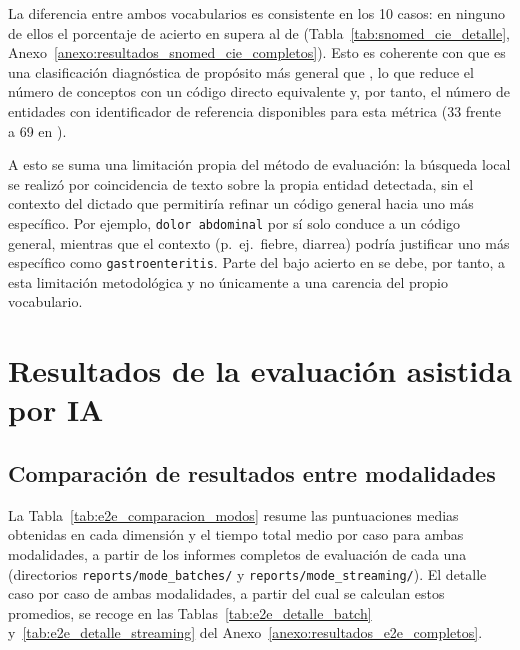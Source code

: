 
La diferencia entre ambos vocabularios es consistente en los 10 casos: en ninguno de ellos el
porcentaje de acierto en  supera al de 
(Tabla~\ref{tab:snomed_cie_detalle}, Anexo~\ref{anexo:resultados_snomed_cie_completos}). Esto es
coherente con que  es una clasificación diagnóstica de propósito más
general que , lo que reduce el número de conceptos con un código directo
equivalente y, por tanto, el número de entidades con identificador de referencia disponibles para
esta métrica (33 frente a 69 en ).

A esto se suma una limitación propia del método de evaluación: la búsqueda local se realizó por
coincidencia de texto sobre la propia entidad detectada, sin el contexto del dictado que permitiría
refinar un código general hacia uno más específico. Por ejemplo, \texttt{dolor abdominal} por sí
solo conduce a un código general, mientras que el contexto (p.\ ej.\ fiebre, diarrea) podría
justificar uno más específico como \texttt{gastroenteritis}. Parte del bajo acierto en
 se debe, por tanto, a esta limitación metodológica y no únicamente a una
carencia del propio vocabulario.

\section{Resultados de la evaluación  asistida por IA}\label{section:resultados_e2e}

\subsection{Comparación de resultados entre modalidades}\label{subsection:comparacion_e2e}

La Tabla~\ref{tab:e2e_comparacion_modos} resume las puntuaciones medias obtenidas en cada dimensión y
el tiempo total medio por caso para ambas modalidades, a partir de los informes completos de
evaluación de cada una (directorios \texttt{reports/mode\_batches/} y
\texttt{reports/mode\_streaming/}). El detalle caso por caso de ambas modalidades, a partir del cual
se calculan estos promedios, se recoge en las Tablas~\ref{tab:e2e_detalle_batch}
y~\ref{tab:e2e_detalle_streaming} del Anexo~\ref{anexo:resultados_e2e_completos}.

